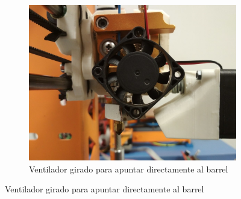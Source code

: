 \documentclass[11pt,a4paper]{article}
\begin{document}
\begin{figure}[H]
\begin{subfigure}[b]{0.4\textwidth}
        \includegraphics[width=\textwidth,cfbox=azul_marcos 4pt 0pt]{FOTOS/MK8_FAN_TRICK2}
		\caption*{Ventilador girado para apuntar directamente al barrel}
    \end{subfigure}
\end{figure}
\end{document}
